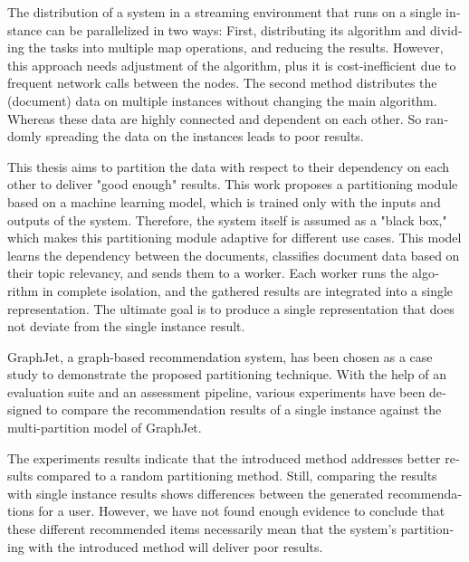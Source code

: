 
\null\vfil
\begin{otherlanguage}{english}
\begin{center}\textsf{\textbf{\abstractname}}\end{center}

\noindent
The distribution of a system in a streaming environment that runs on a single instance can be parallelized in two ways: First, distributing its algorithm and dividing the tasks into multiple map operations, and reducing the results. However, this approach needs adjustment of the algorithm, plus it is cost-inefficient due to frequent network calls between the nodes. The second method distributes the (document) data on multiple instances without changing the main algorithm. Whereas these data are highly connected and dependent on each other. So randomly spreading the data on the instances leads to poor results.

This thesis aims to partition the data with respect to their dependency on each other to deliver "good enough" results. This work proposes a partitioning module based on a machine learning model, which is trained only with the inputs and outputs of the system. Therefore, the system itself is assumed as a "black box," which makes this partitioning module adaptive for different use cases. This model learns the dependency between the documents, classifies document data based on their topic relevancy, and sends them to a worker. Each worker runs the algorithm in complete isolation, and the gathered results are integrated into a single representation. The ultimate goal is to produce a single representation that does not deviate from the single instance result.

GraphJet, a graph-based recommendation system, has been chosen as a case study to demonstrate the proposed partitioning technique. With the help of an evaluation suite and an assessment pipeline, various experiments have been designed to compare the recommendation results of a single instance against the multi-partition model of GraphJet.


The experiments results indicate that the introduced method addresses better results compared to a random partitioning method. Still, comparing the results with single instance results shows differences between the generated recommendations for a user. However, we have not found enough evidence to conclude that these different recommended items necessarily mean that the system's partitioning with the introduced method will deliver poor results.


\end{otherlanguage}
\vfil\null
\newpage

